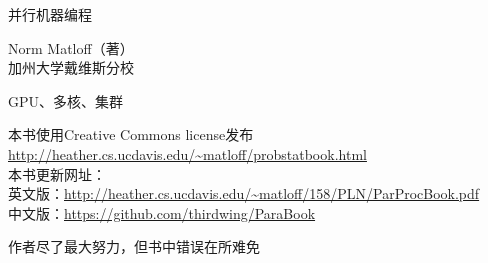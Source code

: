 \pagecolor{yellow}
\color{black}

\bigskip

\begin{center}
{\Huge 并行机器编程}

{\LARGE Norm Matloff（著）\\
加州大学戴维斯分校}

\medskip



\bigskip

\vspace{0.5in}

{\LARGE GPU、多核、集群}
\end{center}
\vspace{1in}



\vspace{1.5in}
\noindent 本书使用Creative Commons license发布\\
\url{http://heather.cs.ucdavis.edu/~matloff/probstatbook.html}\\
\medskip
\noindent 本书更新网址：\\
英文版：\url{http://heather.cs.ucdavis.edu/~matloff/158/PLN/ParProcBook.pdf}\\
中文版：\url{https://github.com/thirdwing/ParaBook}

\medskip
\noindent 作者尽了最大努力，但书中错误在所难免

\newpage
